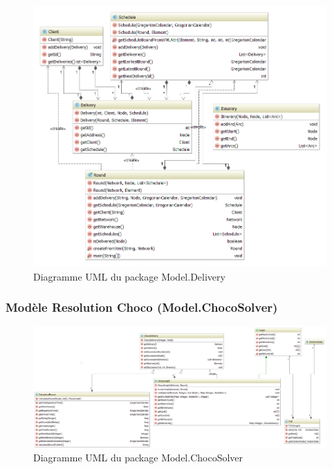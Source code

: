 \begin{figure}[h]
    \centering
    \includegraphics[width=160mm]{../diagrams/classes_packages/classes_packages/model/delivery.png}
    \caption{Diagramme UML du package Model.Delivery}
    \label{diagram:uml_model_delivery}
\end{figure}
\pagebreak

\subsubsection{Mod\`ele Resolution Choco (Model.ChocoSolver)}

\begin{figure}[h]
    \centering
    \includegraphics[width=160mm]{../diagrams/classes_packages/classes_packages/model/chocoSolver.png}
    \caption{Diagramme UML du package Model.ChocoSolver}
    \label{diagram:uml_model_choco}
\end{figure}
\pagebreak

